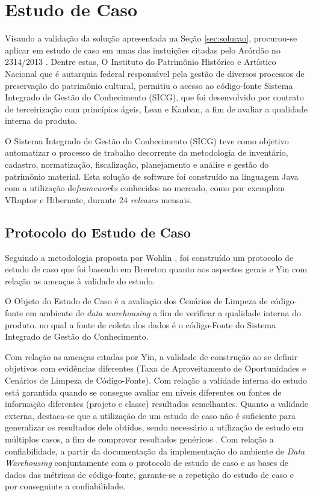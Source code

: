 \section {Estudo de Caso}

Visando a validação da solução apresentada na Seção \ref{sec:solucao}, procurou-se aplicar em estudo de caso em umas das instuições citadas pelo Acórdão no 2314/2013 \cite{TCU:2013}. Dentre estas, O Instituto do Patrimônio Histórico e Artístico Nacional que é autarquia federal responsável pela gestão de diversos processos de preservação do patrimônio cultural, permitiu o acesso ao código-fonte Sistema Integrado de Gestão do Conhecimento (SICG), que foi desenvolvido por contrato de terceirização com princípios ágeis, Lean e Kanban, a fim de avaliar a qualidade interna do produto. 

O Sistema Integrado de Gestão do Conhecimento (SICG) teve como objetivo automatizar o processo de trabalho decorrente da metodologia de inventário, cadastro, normatização, fiscalização, planejamento e análise e gestão do patrimônio material. Esta solução de software foi construído na linguagem Java com a utilização de\textit{frameworks} conhecidos no mercado, como por exemplom VRaptor e Hibernate, durante 24 \textit{releases} mensais.

\subsection{Protocolo do Estudo de Caso}
Seguindo a metodologia proposta por Wohlin \cite{wohlin2012experimentation}, foi construído um protocolo de estudo de caso que foi baseado em Brereton \cite{brereton2008using} quanto aos aspectos gerais e Yin \cite{yin2011applications} com relação as ameaças à validade do estudo. 

O Objeto do Estudo de Caso é a avaliação dos Cenários de Limpeza de código-fonte em ambiente de \textit{data warehousing} a fim de verificar a qualidade interna do produto. no qual a fonte de coleta dos dados é o código-Fonte do Sistema Integrado de Gestão do Conhecimento.

Com relação as ameaças citadas por Yin, a validade de construção ao se definir objetivos com evidências diferentes (Taxa de Aproveitamento de Oportunidades e Cenários de Limpeza de Código-Fonte). Com relação a validade interna do estudo está garantida quando se consegue avaliar em níveis diferentes ou fontes de informação diferentes (projeto e classe) resultados semelhantes. Quanto a validade externa, destaca-se que a utilização de um estudo de caso não é suficiente para generalizar os resultados dele obtidos, sendo necessário a utilização de estudo em múltiplos casos, a fim de comprovar resultados genéricos \cite{yin2011applications}. Com relação a confiabilidade, a partir da documentação da implementação do ambiente de \textit{Data Warehousing} conjuntamente com o protocolo de estudo de caso e as bases de dados das métricas de código-fonte, garante-se a repetição do estudo de caso e por conseguinte a confiabilidade.




